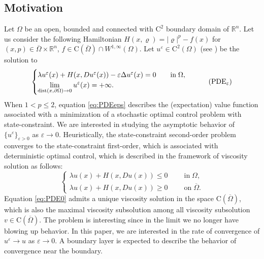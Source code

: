\documentclass[11pt,reqno]{amsart}
\numberwithin{figure}{section}
\theoremstyle{plain}
\theoremstyle{remark}
\numberwithin{equation}{section}
\newcommand{\rmC}{\mathrm{C}}
\begin{document}
\subsection{Motivation} Let $\Omega$ be an open, bounded and connected with $\mathrm{C}^2$ boundary domain of $\mathbb{R}^n$. Let us consider the following Hamiltonian $ H(x,\varrho) = |\varrho|^p-f(x)$ for $(x,p)\in \overline{\Omega}\times \mathbb{R}^n$, $f\in \mathrm{C}(\overline{\Omega})\cap W^{1,\infty}(\Omega)$. Let $u^\varepsilon\in \mathrm{C}^2(\Omega)$ (see \cite{Lasry1989}) be the solution to 
\begin{equation}\label{eq:PDEeps}
    \begin{cases}
    \lambda u^\varepsilon(x) + H(x,Du^\varepsilon(x)) - \varepsilon \Delta u^\varepsilon(x) = 0 \qquad
    \text{in}\;\Omega, \vspace{0cm}\\
    \displaystyle  \lim_{\mathrm{dist}(x,\partial \Omega)\to 0} u^\varepsilon(x) = +\infty.
    \end{cases} \tag{PDE$_\varepsilon$}
\end{equation}
When $1<p\leq 2$, equation \eqref{eq:PDEeps} describes the (expectation) value function associated with a minimization of a stochastic optimal control problem with state-constraint. We are interested in studying the asymptotic behavior of $\{u^\varepsilon\}_{\varepsilon>0}$ as $\varepsilon\rightarrow 0$. Heuristically, the state-constraint second-order problem converges to the state-constraint first-order, which is associated with deterministic optimal control, which is described in the framework of viscosity solution as follows:
\begin{equation}\label{eq:PDE0}
    \begin{cases}
     \lambda u(x) + H(x,Du(x)) \leq 0\;\qquad\text{in}\;\Omega,\\
     \lambda u(x) + H(x,Du(x)) \geq 0\;\qquad\text{on}\;\overline{\Omega}.
    \end{cases} \tag{PDE$_0$}
\end{equation}
Equation \eqref{eq:PDE0} admits a unique viscosity solution in the space $\rmC(\overline{\Omega})$, which is also the maximal viscosity subsolution among all viscosity subsolution $v\in\rmC(\overline{\Omega})$. The problem is interesting since in the limit we no longer have blowing up behavior. In this paper, we are interested in the rate of convergence of $u^\varepsilon \to u$ as $\varepsilon\to 0$. A boundary layer is expected to describe the behavior of convergence near the boundary.
\end{document}
